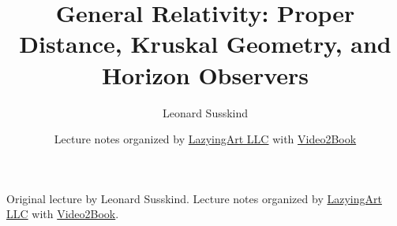 \documentclass[11pt,oneside]{book}
\begin{document}
\frontmatter
\hypersetup{pageanchor=false}
\title{General Relativity: Proper Distance, Kruskal Geometry, and Horizon Observers}
\author{Leonard Susskind}
\date{Lecture notes organized by \href{https://lazying.art}{LazyingArt LLC} with \href{https://github.com/lachlanchen/Video2Book}{Video2Book}}
\maketitle
\begin{center}
\small Original lecture by Leonard Susskind. Lecture notes organized by \href{https://lazying.art}{LazyingArt LLC} with \href{https://github.com/lachlanchen/Video2Book}{Video2Book}.
\end{center}
\clearpage
\hypersetup{pageanchor=true}
\mainmatter

\end{document}
